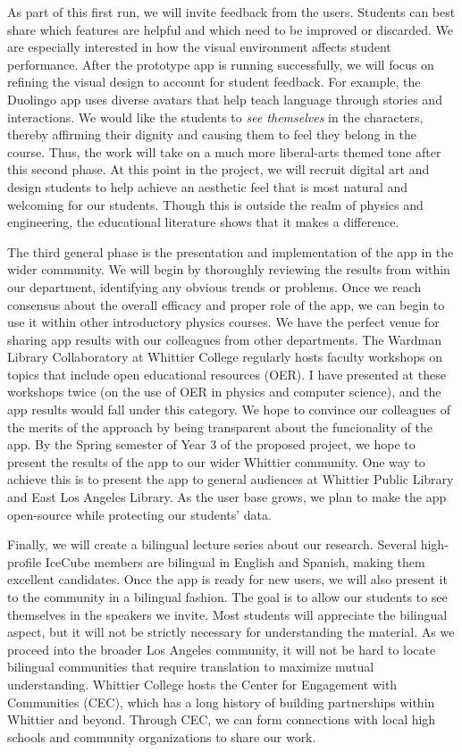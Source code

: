 \documentclass[11pt]{amsart}
\begin{document}
As part of this first run, we will invite feedback from the users.  Students can best share which features are helpful and which need to be improved or discarded.  We are especially interested in how the visual environment affects student performance.  After the prototype app is running successfully, we will focus on refining the visual design to account for student feedback.  For example, the Duolingo app uses diverse avatars that help teach language through stories and interactions.  We would like the students to \textit{see themselves} in the characters, thereby affirming their dignity and causing them to feel they belong in the course.  Thus, the work will take on a much more liberal-arts themed tone after this second phase.  At this point in the project, we will recruit digital art and design students to help achieve an aesthetic feel that is most natural and welcoming for our students.  Though this is outside the realm of physics and engineering, the educational literature shows that it makes a difference. 

The third general phase is the presentation and implementation of the app in the wider community.  We will begin by thoroughly reviewing the results from within our department, identifying any obvious trends or problems.  Once we reach consensus about the overall efficacy and proper role of the app, we can begin to use it within other introductory physics courses.  We have the perfect venue for sharing app results with our colleagues from other departments.  The Wardman Library Collaboratory at Whittier College regularly hosts faculty workshops on topics that include open educational resources (OER).  I have presented at these workshops twice (on the use of OER in physics and computer science), and the app results would fall under this category.  We hope to convince our colleagues of the merits of the approach by being transparent about the funcionality of the app.  By the Spring semester of Year 3 of the proposed project, we hope to present the results of the app to our wider Whittier community.  One way to achieve this is to present the app to general audiences at Whittier Public Library and East Los Angeles Library.  As the user base grows, we plan to make the app open-source while protecting our students' data.

Finally, we will create a bilingual lecture series about our research.  Several high-profile IceCube members are bilingual in English and Spanish, making them excellent candidates.  Once the app is ready for new users, we will also present it to the community in a bilingual fashion.  The goal is to allow our students to see themselves in the speakers we invite.  Most students will appreciate the bilingual aspect, but it will not be strictly necessary for understanding the material.  As we proceed into the broader Los Angeles community, it will not be hard to locate bilingual communities that require translation to maximize mutual understanding.  Whittier College hosts the Center for Engagement with Communities (CEC), which has a long history of building partnerships within Whittier and beyond.  Through CEC, we can form connections with local high schools and community organizations to share our work.
\end{document}
